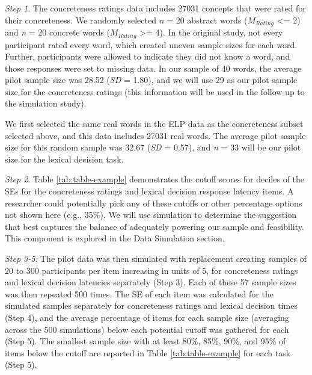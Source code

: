 \documentclass[
  man]{apa7}
\begin{document}
\emph{Step 1}. The concreteness ratings data includes 27031 concepts that were rated for their concreteness. We randomly selected \emph{n} = 20 abstract words (\(M_{Rating}\) \textless= 2) and \emph{n} = 20 concrete words (\(M_{Rating}\) \textgreater= 4). In the original study, not every participant rated every word, which created uneven sample sizes for each word. Further, participants were allowed to indicate they did not know a word, and those responses were set to missing data. In our sample of 40 words, the average pilot sample size was 28.52 (\emph{SD} = 1.80), and we will use 29 as our pilot sample size for the concreteness ratings (this information will be used in the follow-up to the simulation study).

We first selected the same real words in the ELP data as the concreteness subset selected above, and this data includes 27031 real words. The average pilot sample size for this random sample was 32.67 (\emph{SD} = 0.57), and \emph{n} = 33 will be our pilot size for the lexical decision task.

\emph{Step 2}. Table \ref{tab:table-example} demonstrates the cutoff scores for deciles of the SEs for the concreteness ratings and lexical decision response latency items. A researcher could potentially pick any of these cutoffs or other percentage options not shown here (e.g., 35\%). We will use simulation to determine the suggestion that best captures the balance of adequately powering our sample and feasibility. This component is explored in the Data Simulation section.

\emph{Step 3-5}. The pilot data was then simulated with replacement creating samples of 20 to 300 participants per item increasing in units of 5, for concreteness ratings and lexical decision latencies separately (Step 3). Each of these 57 sample sizes was then repeated 500 times. The SE of each item was calculated for the simulated samples separately for concreteness ratings and lexical decision times (Step 4), and the average percentage of items for each sample size (averaging across the 500 simulations) below each potential cutoff was gathered for each (Step 5). The smallest sample size with at least 80\%, 85\%, 90\%, and 95\% of items below the cutoff are reported in Table \ref{tab:table-example} for each task (Step 5).
\end{document}
